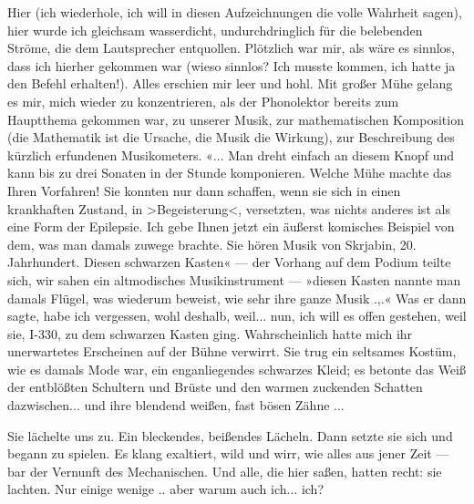 Hier (ich wiederhole, ich will in diesen Aufzeichnungen die volle
Wahrheit sagen), hier wurde ich gleichsam wasserdicht,
undurchdringlich für die belebenden Ströme, die dem Lautsprecher
entquollen. Plötzlich war mir, als wäre es sinnlos, dass ich
hierher gekommen war (wieso sinnlos? Ich musste kommen, ich hatte
ja den Befehl erhalten!). Alles erschien mir leer und hohl. Mit
großer Mühe gelang es mir, mich wieder zu konzentrieren, als der
Phonolektor bereits zum Hauptthema gekommen war, zu unserer Musik,
zur mathematischen Komposition (die Mathematik ist die Ursache, die
Musik die Wirkung), zur Beschreibung des kürzlich erfundenen
Musikometers. «... Man dreht einfach an diesem Knopf und kann bis
zu drei Sonaten in der Stunde komponieren. Welche Mühe machte das
Ihren Vorfahren! Sie konnten nur dann schaffen, wenn sie sich in
einen krankhaften Zustand, in
\textgreater{}Begeisterung\textless{}, versetzten, was nichts
anderes ist als eine Form der Epilepsie. Ich gebe Ihnen jetzt ein
äußerst komisches Beispiel von dem, was man damals zuwege brachte.
Sie hören Musik von Skrjabin, 20. Jahrhundert. Diesen schwarzen
Kasten« — der Vorhang auf dem Podium teilte sich, wir sahen ein
altmodisches Musikinstrument — »diesen Kasten nannte man damals
Flügel, was wiederum beweist, wie sehr ihre ganze Musik .,.« Was er
dann sagte, habe ich vergessen, wohl deshalb, weil... nun, ich will
es offen gestehen, weil sie, I-330, zu dem schwarzen Kasten ging.
Wahrscheinlich hatte mich ihr unerwartetes Erscheinen auf der Bühne
verwirrt. Sie trug ein seltsames Kostüm, wie es damals Mode war,
ein enganliegendes schwarzes Kleid; es betonte das Weiß der
entblößten Schultern und Brüste und den warmen zuckenden Schatten
dazwischen... und ihre blendend weißen, fast bösen Zähne ...

Sie lächelte uns zu. Ein bleckendes, beißendes Lächeln. Dann setzte
sie sich und begann zu spielen. Es klang exaltiert, wild und wirr,
wie alles aus jener Zeit — bar der Vernunft des Mechanischen. Und
alle, die hier saßen, hatten recht: sie lachten. Nur einige wenige
.. aber warum auch ich... ich?

